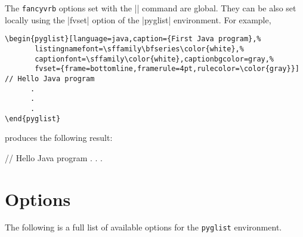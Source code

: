 \documentclass{article}
\begin{document}
\bigskip

The \texttt{fancyvrb} options set with the |\fvset| command are  global. They can be also set locally using the |fvset| option of the |pyglist| environment. For example,

\begin{verbatim}
\begin{pyglist}[language=java,caption={First Java program},%
       listingnamefont=\sffamily\bfseries\color{white},%
       captionfont=\sffamily\color{white},captionbgcolor=gray,%
       fvset={frame=bottomline,framerule=4pt,rulecolor=\color{gray}}]
// Hello Java program
      .
      .
      .
\end{pyglist}
\end{verbatim}

produces the following result:

\begin{pyglist}[language=java,caption={First Java program},%
       listingnamefont=\sffamily\bfseries\color{white},%
       captionfont=\sffamily\color{white},captionbgcolor=gray,%
       fvset={frame=bottomline,framerule=4pt,rulecolor=\color{gray}},%
       fontsize=\MacroFont]
// Hello Java program
      .
      .
      .
\end{pyglist}

\section{Options}

The following is a full list of available options for the \texttt{pyglist} environment. 
\end{document}
